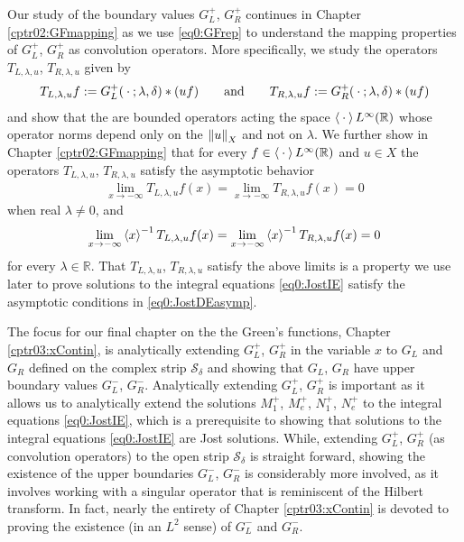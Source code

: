 \documentclass[../dissertation.tex]{subfiles}
\begin{document}
Our study of the boundary values $G_L^+$, $G_R^+$ continues in Chapter 
\ref{cptr02:GFmapping} as we use \ref{eq0:GFrep} to understand the mapping
properties of $G_L^+$, $G_R^+$ as convolution operators. More specifically, 
we study the operators $T_{L, \lambda, u}$, $T_{R, \lambda, u}$ given by
\begin{align} \label{eq0:Tstar}
	T_{L, \lambda, u} f:= G_L^+(\kern 0.5ex \cdot \kern 0.5ex; \lambda, \delta)*(uf) 
	\qquad \text{and} \qquad 
	T_{R, \lambda, u} f:= G_R^+(\kern 0.5ex \cdot \kern 0.5ex; \lambda, \delta)*(uf) 
\end{align}
and show that the are bounded operators acting the space 
$\left\langle \kern 0.5ex \cdot \kern 0.5ex \right\rangle L^\infty(\mathbb R)$ whose operator norms depend only 
on the $\left\| u \right\|_X$ and not on $\lambda$. We further show in Chapter 
\ref{cptr02:GFmapping} that for every 
$f \in \left\langle \kern 0.5ex \cdot \kern 0.5ex \right\rangle L^\infty(\mathbb R)$
and $u \in X$ the operators $T_{L, \lambda, u}$, $T_{R, \lambda, u}$
satisfy the asymptotic behavior
\begin{align*}
	\lim_{x\to-\infty} T_{L, \lambda, u} f(x) 
		= \lim_{x\to-\infty} T_{R, \lambda, u} f(x) 
		= 0
\end{align*}
when real $\lambda \ne 0$, and 
\begin{align*}
	\lim_{x\to-\infty} \left\langle x \right\rangle^{-1} T_{L, \lambda, u} f(x) 
		= \lim_{x\to-\infty} \left\langle x \right\rangle^{-1} T_{R, \lambda, u} f(x) 
		= 0
\end{align*}
for every $\lambda \in \mathbb R$. That $T_{L, \lambda, u}$, 
$T_{R, \lambda, u}$ satisfy the above limits is a property we use later to 
prove solutions to the integral equations \eqref{eq0:JostIE} satisfy the 
asymptotic conditions in \eqref{eq0:JostDEasymp}.

The focus for our final chapter on the the Green's functions, Chapter 
\ref{cptr03:xContin}, is analytically extending $G_L^+$, $G_R^+$ in 
the variable $x$ to $G_L$ and 
$G_R$ defined on the complex strip $\mathcal S_\delta$ and showing that $G_L$, $G_R$ 
have upper boundary values $G_L^-$, $G_R^-$. Analytically extending $G_L^+$, 
$G_R^+$ is important as it allows us to analytically extend the solutions 
$M_1^+$, $M_e^+$, $N_1^+$, $N_e^+$ to the integral equations \ref{eq0:JostIE},
which is a prerequisite to showing that solutions to the integral 
equations \ref{eq0:JostIE} are Jost solutions. While, extending $G_L^+$, $G_R^+$
(as convolution operators) to the open strip $\mathcal S_\delta$ is straight
forward, showing the existence of the upper boundaries $G_L^-$, $G_R^-$ is 
considerably more involved, as it involves working with a singular operator
that is reminiscent of the Hilbert transform. In fact, nearly the entirety of
Chapter \ref{cptr03:xContin} is devoted to proving the existence (in an $L^2$ 
sense) of $G_L^-$ and $G_R^-$.
\end{document}
